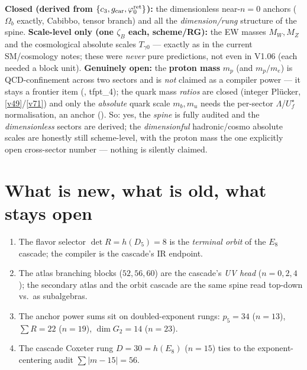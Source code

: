 \begin{gapbox}
\textbf{Closed (derived from $\{c_3,g_{\mathrm{car}},\varphi_0^{\mathrm{ret}}\}$):} the dimensionless near-$n{=}0$ anchors
($\Omega_b$ exactly, Cabibbo, tensor branch) and all the \emph{dimension/rung} structure of the spine.
\textbf{Scale-level only (one $\zeta_B$ each, scheme/RG):} the EW masses $M_W,M_Z$ and the cosmological
absolute scales $T_{\gamma0}$ --- exactly as in the current SM/cosmology notes; these were \emph{never}
pure predictions, not even in V1.06 (each needed a block unit). \textbf{Genuinely open:} the
\textbf{proton mass} $m_p$ (and $m_p/m_e$) is QCD-confinement across two sectors and is \emph{not} claimed
as a compiler power --- it stays a frontier item (\mO, tfpt\_4); the quark mass \emph{ratios} are closed
(integer Pl\"ucker, \vref{v49}/\vref{v71}) and only the \emph{absolute} quark scale $m_b,m_u$ needs the per-sector
$\Lambda$/$U_f^\star$ normalisation, an anchor (\mO). So: yes, the \emph{spine} is fully audited and the
\emph{dimensionless} sectors are derived; the \emph{dimensionful} hadronic/cosmo absolute scales are
honestly still scheme-level, with the proton mass the one explicitly open cross-sector number --- nothing
is silently claimed.
\end{gapbox}

\section{What is new, what is old, what stays open}
\begin{keybox}
\begin{enumerate}[leftmargin=1.5em]
\item The flavor selector $\det R=h(D_5)=8$ is the \emph{terminal orbit} of the $E_8$ cascade; the
      compiler is the cascade's IR endpoint. \mE
\item The atlas branching blocks ($52,56,60$) are the cascade's \emph{UV head} ($n=0,2,4$); the secondary
      atlas and the orbit cascade are the same spine read top-down vs.\ as subalgebras. \mE
\item The anchor power sums sit on doubled-exponent rungs: $p_5=34$ ($n{=}13$), $\sum R=22$ ($n{=}19$),
      $\dim G_2=14$ ($n{=}23$). \mE
\item The cascade Coxeter rung $D=30=h(E_8)$ ($n{=}15$) ties to the exponent-centering audit
      $\sum|m{-}15|=56$. \mE
\end{enumerate}
\end{keybox}

